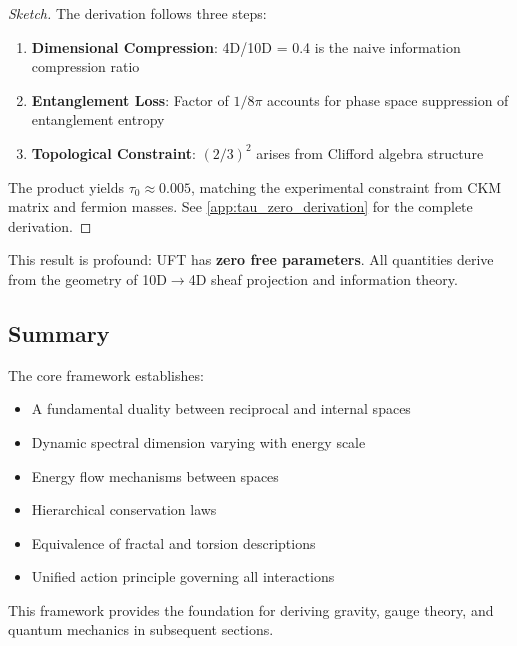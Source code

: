\begin{proof}[Sketch]
The derivation follows three steps:
\begin{enumerate}
    \item \textbf{Dimensional Compression}: 4D/10D = 0.4 is the naive information compression ratio
    \item \textbf{Entanglement Loss}: Factor of $1/8\pi$ accounts for phase space suppression of entanglement entropy
    \item \textbf{Topological Constraint}: $(2/3)^2$ arises from Clifford algebra structure
\end{enumerate}
The product yields $\tau_0 \approx 0.005$, matching the experimental constraint from CKM matrix and fermion masses. See \cref{app:tau_zero_derivation} for the complete derivation.
\end{proof}

This result is profound: UFT has \textbf{zero free parameters}. All quantities derive from the geometry of 10D$\to$4D sheaf projection and information theory.

\subsection{Summary}

The core framework establishes:
\begin{itemize}
    \item A fundamental duality between reciprocal and internal spaces
    \item Dynamic spectral dimension varying with energy scale
    \item Energy flow mechanisms between spaces
    \item Hierarchical conservation laws
    \item Equivalence of fractal and torsion descriptions
    \item Unified action principle governing all interactions
\end{itemize}

This framework provides the foundation for deriving gravity, gauge theory, and quantum mechanics in subsequent sections.

